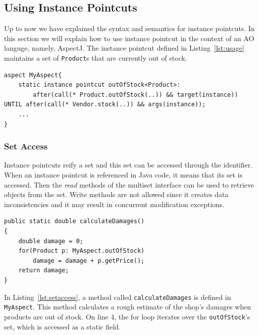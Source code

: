 \documentclass{acm_proc_article-sp}
\begin{document}
\subsection{Using Instance Pointcuts}
Up to now we have explained the syntax and semantics for instance pointcuts. In this section we will explain how to use instance pointcut in the context of an AO languge, namely, AspectJ. The instance pointcut defined in Listing~\ref{lst:usage} maintains a set of \texttt{Product}s that are currently out of stock.

\begin{lstlisting}[float=h!, caption={An instance pointcut for out of stock products}, label={lst:usage}]
aspect MyAspect{
	static instance pointcut outOfStock<Product>: 
		after(call(* Product.outOfStock(..)) && target(instance)) UNTIL after(call(* Vendor.stock(..)) && args(instance));
	...
}
\end{lstlisting}

\subsubsection{Set Access}
Instance pointcuts reify a set and this set can be accessed through the identifier. When an instance  pointcut is referenced in Java code, it means that its set is accessed. Then the \emph{read} methods of the multiset interface can be used to retrieve objects from the set. Write methods are not allowed since it creates data inconsistencies and it may result in concurrent modification exceptions. 


\begin{lstlisting}[float=h!, caption={Calculate a damage estimate for out of stock products}, label={lst:setaccess}]
public static double calculateDamages()
{
	double damage = 0;
	for(Product p: MyAspect.outOfStock)
		damage = damage + p.getPrice();
	return damage;
}
\end{lstlisting}

In Listing~\ref{lst:setaccess},  a method called \texttt{calculateDamages} is defined in \texttt{MyAspect}. This method calculates a rough estimate of the shop's damages when products are out of stock. On line 4, the for loop iterates over the \texttt{outOfStock}'s set, which is accessed as a static field.
\end{document}
